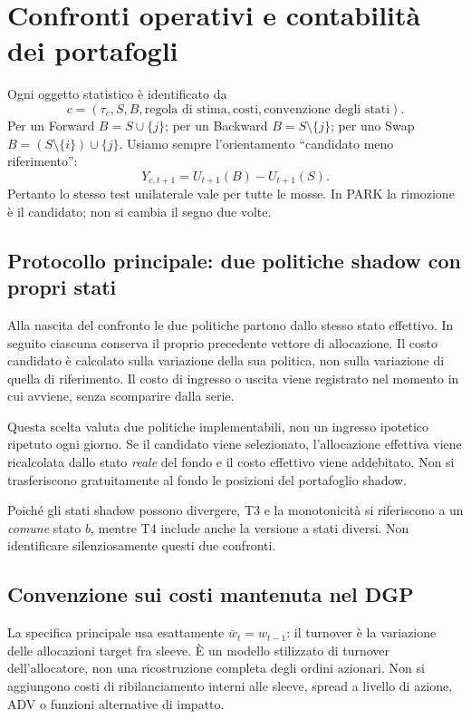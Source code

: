 \documentclass[11pt,a4paper]{article}
\theoremstyle{definition}\newtheorem{definition}[theorem]{Definizione}
\theoremstyle{remark}\newtheorem{remark}[theorem]{Osservazione}
\begin{document}
\section{Confronti operativi e contabilità dei portafogli}
\label{sec:comparisons}
Ogni oggetto statistico è identificato da
\begin{equation}
 c=(\tau_c,S,B,\text{regola di stima},\text{costi},\text{convenzione degli stati}).
\end{equation}
Per un Forward $B=S\cup\{j\}$; per un Backward $B=S\setminus\{j\}$; per uno Swap $B=(S\setminus\{i\})\cup\{j\}$. Usiamo sempre l'orientamento ``candidato meno riferimento'':
\begin{equation}
 Y_{c,t+1}=U_{t+1}(B)-U_{t+1}(S).\label{eq:Y}
\end{equation}
Pertanto lo stesso test unilaterale vale per tutte le mosse. In PARK la rimozione è il candidato; non si cambia il segno due volte.

\subsection{Protocollo principale: due politiche shadow con propri stati}
Alla nascita del confronto le due politiche partono dallo stesso stato effettivo. In seguito ciascuna conserva il proprio precedente vettore di allocazione. Il costo candidato è calcolato sulla variazione della sua politica, non sulla variazione di quella di riferimento. Il costo di ingresso o uscita viene registrato nel momento in cui avviene, senza scomparire dalla serie.

Questa scelta valuta due politiche implementabili, non un ingresso ipotetico ripetuto ogni giorno. Se il candidato viene selezionato, l'allocazione effettiva viene ricalcolata dallo stato \emph{reale} del fondo e il costo effettivo viene addebitato. Non si trasferiscono gratuitamente al fondo le posizioni del portafoglio shadow.

Poiché gli stati shadow possono divergere, T3 e la monotonicità si riferiscono a un \emph{comune} stato $b$, mentre T4 include anche la versione a stati diversi. Non identificare silenziosamente questi due confronti.

\subsection{Convenzione sui costi mantenuta nel DGP}
La specifica principale usa esattamente $\bar w_t=w_{t-1}$: il turnover è la variazione delle allocazioni target fra sleeve. È un modello stilizzato di turnover dell'allocatore, non una ricostruzione completa degli ordini azionari. Non si aggiungono costi di ribilanciamento interni alle sleeve, spread a livello di azione, ADV o funzioni alternative di impatto.
\end{document}
